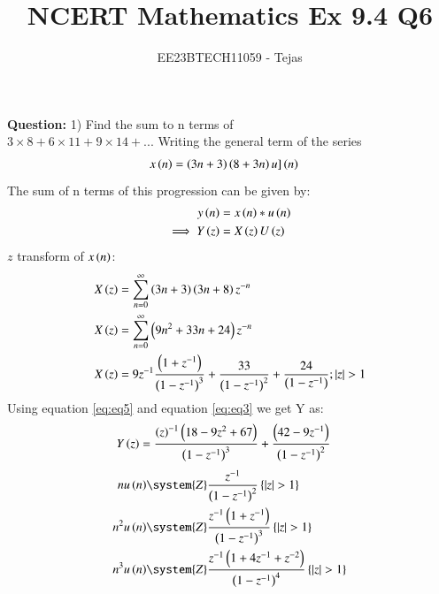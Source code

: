 \documentclass[journal,12pt,twocolumn]{IEEEtran}
\theoremstyle{remark}
\begin{document}

\vspace{3cm}

\title{NCERT Mathematics Ex 9.4 Q6}
\author{EE23BTECH11059 - Tejas$^{}$%
}
\maketitle
\newpage
\textbf{Question:}
1) Find the sum to n terms of\\$3 \times 8 + 6 \times 11 + 9 \times 14 + ...$
    \solution
        Writing the general term of the series
        \begin{align}
            x\left(n\right)&=\left(3n+3\right)\left(8+3n\right)u]\left(n\right)
        \end{align}
        The sum of n terms of this progression can be given by:
        \begin{align}
            y\left(n\right) &= x\left(n\right)*u\left(n\right)\\
            \implies  Y\left(z\right) &= X\left(z\right)U\left(z\right) \label{eq:eq3}
        \end{align}
        $z$ transform of $x\left(n\right)$:
        \begin{align}
            X\left(z\right) &= \sum_{n=0}^{\infty} \left(3n+3\right)\left(3n+8\right)z^{-n} \\
            X\left(z\right) &= \sum_{n=0}^{\infty} \left(9n^2 +33n+24\right)z^{-n} \\
            X\left(z\right)&=9z^{-1}\frac{\left(1+z^{-1}\right)}{\left(1-z^{-1}\right)^3} + \frac{33}{\left(1-z^{-1}\right)^2} +\frac{24}{\left(1-z^{-1}\right)}; \left\vert z\right\vert>1    \label{eq:eq5}
        \end{align}
        Using equation \eqref{eq:eq5} and equation \eqref{eq:eq3} we get Y as:
        \begin{align}
            Y\left(z\right)&= \frac{\left(z\right)^{-1}\left(18-9z^2+67\right)}{\left(1-z^{-1}\right)^3} + \frac{\left(42-9z^{-1}\right)}{\left(1-z^{-1}\right)^2} 
        \end{align}
        \begin{align}
            nu\brak{n} &\system{Z} \frac{z^{-1}}{\brak{1-z^{-1}}^2} \cbrak{\abs{z}>1} \label{eq:z transform of nu{n}} \\
            n^2 u\brak{n} &\system{Z} \frac{z^{-1}\brak{1+z^{-1}}}{\brak{1-z^{-1}}^3} \cbrak{\abs{z}>1}\label{eq:z transform of n^2u{n}} \\
            n^3 u\brak{n} &\system{Z} \frac{z^{-1}\brak{1+4z^{-1}+z^{-2}}}{\brak{1-z^{-1}}^4} \cbrak{\abs{z}>1}\label{eq:z transform of n^3u{n}} 
        \end{align}
\end{document}
